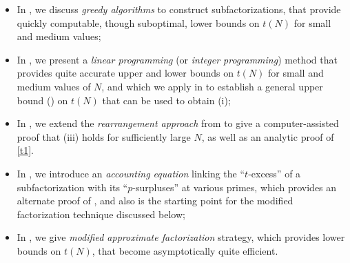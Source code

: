 \documentclass[12pt,a4paper,reqno]{amsart}
\numberwithin{equation}{section}
\theoremstyle{plain}
\theoremstyle{definition}
\begin{document}
\begin{itemize}
  \item In , we discuss \emph{greedy algorithms} to construct subfactorizations, that provide quickly computable, though suboptimal, lower bounds on $t(N)$ for small and medium values;
  \item In , we present a \emph{linear programming} (or \emph{integer programming}) method that provides quite accurate upper and lower bounds on $t(N)$ for small and medium values of $N$, and which we apply in  to establish a general upper bound () on $t(N)$ that can be used to obtain (i);
  \item In , we extend the \emph{rearrangement approach} from \cite{guy-selfridge} to give a computer-assisted proof that (iii) holds for sufficiently large $N$, as well as an analytic proof of \eqref{t1}.
  \item In , we introduce an \emph{accounting equation} linking the ``$t$-excess'' of a subfactorization with its ``$p$-surpluses'' at various primes, which provides an alternate proof of , and also is the starting point for the modified factorization technique discussed below;
  \item In , we give \emph{modified approximate factorization} strategy, which provides lower bounds on $t(N)$, that become asymptotically quite efficient.
\end{itemize}
\end{document}
